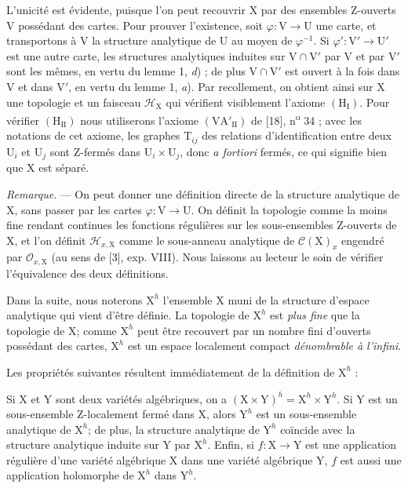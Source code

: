 L'unicité est évidente, puisque l'on peut recouvrir $\mathrm{X}$ par des ensembles Z-ouverts $\mathrm{V}$ possédant des cartes. Pour prouver l'existence, soit $\varphi : \mathrm{V} \to \mathrm{U}$ une carte, et transportons à $\mathrm{V}$ la structure analytique de $\mathrm{U}$ au moyen de $\varphi^{-1}$. Si $\varphi' : \mathrm{V}' \to \mathrm{U}'$ est une autre carte, les structures analytiques induites sur $\mathrm{V} \cap \mathrm{V}'$ par $\mathrm{V}$ et par $\mathrm{V}'$ sont les mêmes, en vertu du lemme 1, \textit{d}) ; de plus $\mathrm{V} \cap \mathrm{V}'$ est ouvert à la fois dans $\mathrm{V}$ et dans $\mathrm{V}'$, en vertu du lemme 1, \textit{a}). Par recollement, on obtient ainsi sur $\mathrm{X}$ une topologie et un faisceau $\mathcal{H}_{\mathrm{X}}$ qui vérifient visiblement l'axiome $(\mathrm{H}_{\mathrm{I}})$. Pour vérifier $(\mathrm{H}_{\mathrm{II}})$ nous utiliserons l'axiome $(\mathrm{VA}'_{\mathrm{II}})$ de [18], n\textsuperscript{o} 34 ; avec les notations de cet axiome, les graphes $\mathrm{T}_{ij}$ des relations d'identification entre deux $\mathrm{U}_i$ et $\mathrm{U}_j$ sont Z-fermés dans $\mathrm{U}_i \times \mathrm{U}_j$, donc \textit{a fortiori} fermés, ce qui signifie bien que $\mathrm{X}$ est séparé.

\textit{Remarque}. --- On peut donner une définition directe de la structure analytique de $\mathrm{X}$, sans passer par les cartes $\varphi : \mathrm{V} \to \mathrm{U}$.
%
%
%
On définit la topologie comme la moins fine rendant continues les fonctions régulières sur les sous-ensembles Z-ouverts de $\mathrm{X}$, et l'on définit $\mathcal{H}_{x,\mathrm{X}}$ comme le sous-anneau analytique de $\mathcal{C}(\mathrm{X})_x$ engendré par $\mathcal{O}_{x,\mathrm{X}}$ (au sens de [3], exp. VIII). Nous laissons au lecteur le soin de vérifier l'équivalence des deux définitions.

Dans la suite, nous noterons $\mathrm{X}^h$ l'ensemble $\mathrm{X}$ muni de la structure d'espace analytique qui vient d'être définie. La topologie de $\mathrm{X}^h$ est \textit{plus fine} que la topologie de $\mathrm{X}$; comme $\mathrm{X}^h$ peut être recouvert par un nombre fini d'ouverts possédant des cartes, $\mathrm{X}^h$ est un espace localement compact \textit{dénombrable à l'infini}.

Les propriétés suivantes résultent immédiatement de la définition de $\mathrm{X}^h$ :

Si $\mathrm{X}$ et $\mathrm{Y}$ sont deux variétés algébriques, on a $(\mathrm{X} \times \mathrm{Y})^h = \mathrm{X}^h \times \mathrm{Y}^h$. Si $\mathrm{Y}$ est un sous-ensemble Z-localement fermé dans $\mathrm{X}$, alors $\mathrm{Y}^h$ est un sous-ensemble analytique de $\mathrm{X}^h$; de plus, la structure analytique de $\mathrm{Y}^h$ coïncide avec la structure analytique induite sur $\mathrm{Y}$ par $\mathrm{X}^h$. Enfin, si $f : \mathrm{X} \to \mathrm{Y}$ est une application régulière d'une variété algébrique $\mathrm{X}$ dans une variété algébrique $\mathrm{Y}$, $f$ est aussi une application holomorphe de $\mathrm{X}^h$ dans $\mathrm{Y}^h$.


